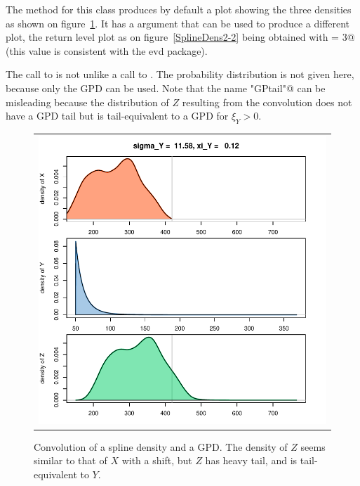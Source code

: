 \documentclass[11pt,a4paper]{report}\usepackage[]{graphicx}\usepackage[]{color}
\newcommand{\pkg}[1]{{\fontseries{b}\selectfont #1}}
\begin{document}
\noindent
The \verb@plot@ method for this class produces by default a plot
showing the three densities as shown on figure~\ref{SplineDens2-1}.
It has a \verb@which@ argument that can be used to produce a different
plot, the return level plot as on figure~\ref{SplineDens2-2} being
obtained with \verb@which = 3@ (this value is consistent with the
\pkg{evd} package).  


The call to \verb@GPtail@ is not unlike a call to \verb@convSL@. The 
probability distribution is not given here, because only the GPD can 
be used. Note that the name \verb@"GPtail"@ can be misleading because
the distribution of $Z$ resulting from the convolution does not have a GPD
tail but is tail-equivalent to a GPD for $\xi_Y>0$.

\begin{figure}
   \centering
   \begin{tabular}{c} 
     \includegraphics[width=12cm]{Rgraphics/figSplineDens2-1.pdf}
   \end{tabular}
   \caption{\label{SplineDens2-1} Convolution of a spline density and
     a GPD. The density of $Z$ seems similar to that of
     $X$ with a shift, but $Z$ has heavy tail, and is tail-equivalent to $Y$.  }
\end{figure}
\end{document}
